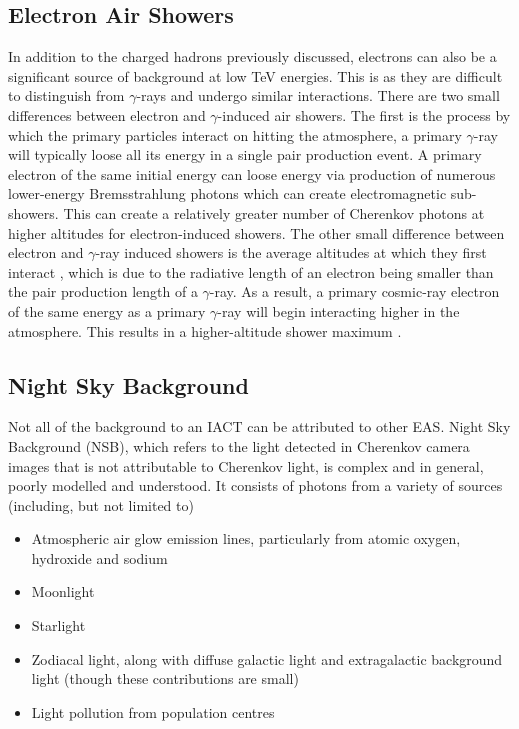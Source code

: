 \subsection{Electron Air Showers}

In addition to the charged hadrons previously discussed, electrons can also be a significant source of background at low TeV energies. This is as they are difficult to distinguish from $\gamma$-rays and undergo similar interactions. There are two small differences between electron and $\gamma$-induced air showers. The first is the process by which the primary particles interact on hitting the atmosphere, a primary $\gamma$-ray will typically loose all its energy in a single pair production event. A primary electron of the same initial energy can loose energy via production of numerous lower-energy Bremsstrahlung photons which can create electromagnetic sub-showers. This can create a relatively greater number of Cherenkov photons at higher altitudes for electron-induced showers. The other small difference between electron and $\gamma$-ray induced showers is the average altitudes at which they first interact \cite{Sitarek1i}, which is due to the radiative length of an electron being smaller than the pair production length of a $\gamma$-ray. As a result, a primary cosmic-ray electron of the same energy as a primary $\gamma$-ray will begin interacting higher in the atmosphere. This results in a higher-altitude shower maximum \cite{lypova}. 

\subsection{Night Sky Background}
Not all of the background to an IACT can be attributed to other EAS. Night Sky Background (NSB), which refers to the light detected in Cherenkov camera images that is not attributable to Cherenkov light, is complex and in general, poorly modelled and understood. It consists of photons from a variety of sources (including, but not limited to)

\begin{itemize}
    \item Atmospheric air glow emission lines, particularly from atomic oxygen, hydroxide and sodium
    \item Moonlight
    \item Starlight
    \item Zodiacal light, along with diffuse galactic light and extragalactic background light (though these contributions are small) \cite{nsbref}
    \item Light pollution from population centres
\end{itemize}

